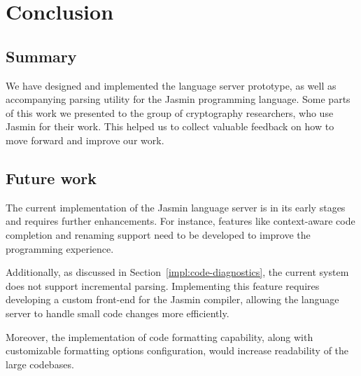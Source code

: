 \chapter{Conclusion}
\label{chap:conclusion}

\section{Summary}

We have designed and implemented the language server prototype, as well as
accompanying parsing utility for the Jasmin programming language. Some parts 
of this work we presented to the group of cryptography researchers, who use 
Jasmin for their work. This helped us to collect valuable feedback on how 
to move forward and improve our work.

\section{Future work}

The current implementation of the Jasmin language server is in its early stages
and requires further enhancements. For instance, features like context-aware
code completion and renaming support need to be developed to improve the
programming experience. 

Additionally, as discussed in Section~\ref{impl:code-diagnostics}, the current
system does not support incremental parsing. Implementing this feature requires
developing a custom front-end for the Jasmin compiler, allowing the language
server to handle small code changes more efficiently.

Moreover, the implementation of code formatting capability, along with
customizable formatting options configuration, would increase readability
of the large codebases.
